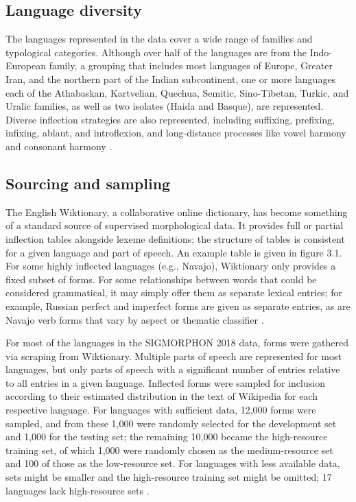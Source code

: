 \subsection{Language diversity}

The languages represented in the data cover a wide range of families and typological categories. Although over half of the languages are from the Indo-European family, a grouping that includes most languages of Europe, Greater Iran, and the northern part of the Indian subcontinent, one or more languages each of the Athabaskan, Kartvelian, Quechua, Semitic, Sino-Tibetan, Turkic, and Uralic families, as well as two isolates (Haida and Basque), are represented. Diverse inflection strategies are also represented, including suffixing, prefixing, infixing, ablaut, and introflexion, and long-distance processes like vowel harmony and consonant harmony \parencite{Cotterell2018b}.

\subsection{Sourcing and sampling}

The English Wiktionary, a collaborative online dictionary, has become something of a standard source of supervised morphological data. It provides full or partial inflection tables alongside lexeme definitions; the structure of tables is consistent for a given language and part of speech. An example table is given in figure 3.1. For some highly inflected languages (e.g., Navajo), Wiktionary only provides a fixed subset of forms. For some relationships between words that could be considered grammatical, it may simply offer them as separate lexical entries; for example, Russian perfect and imperfect forms are given as separate entries, as are Navajo verb forms that vary by aspect or thematic classifier \parencite{Wiktionary}.  

For most of the languages in the SIGMORPHON 2018 data, forms were gathered via scraping from Wiktionary. Multiple parts of speech are represented for most languages, but only parts of speech with a significant number of entries relative to all entries in a given language. Inflected forms were sampled for inclusion according to their estimated distribution in the text of Wikipedia for each respective language. For languages with sufficient data, 12,000 forms were sampled, and from these 1,000 were randomly selected for the development set and 1,000 for the testing set; the remaining 10,000 became the high-resource training set, of which 1,000 were randomly chosen as the medium-resource set and 100 of those as the low-resource set. For languages with less available data, sets might be smaller and the high-resource training set might be omitted; 17 languages lack high-resource sets \parencite{Cotterell2018b}.

